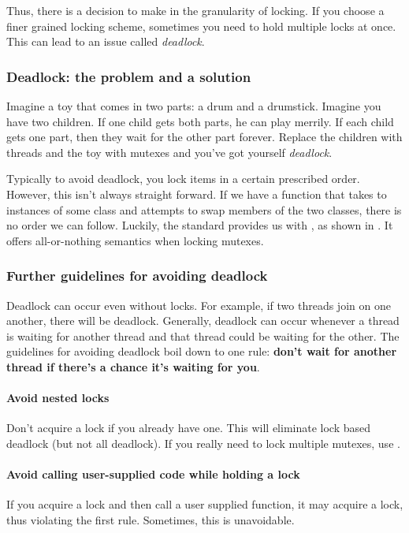 Thus, there is a decision to make in the granularity of locking. If you choose a finer grained locking scheme, sometimes you need to hold multiple locks at once. This can lead to an issue called \emph{deadlock}.

\subsubsection{Deadlock: the problem and a solution}
Imagine a toy that comes in two parts: a drum and a drumstick. Imagine you have two children. If one child gets both parts, he can play merrily. If each child gets one part, then they wait for the other part forever. Replace the children with threads and the toy with mutexes and you've got yourself \emph{deadlock}.

Typically to avoid deadlock, you lock items in a certain prescribed order. However, this isn't always straight forward. If we have a function that takes to instances of some class and attempts to swap members of the two classes, there is no order we can follow. Luckily, the standard provides us with , as shown in . It offers all-or-nothing semantics when locking mutexes. 


\subsubsection{Further guidelines for avoiding deadlock}
Deadlock can occur even without locks. For example, if two threads join on one another, there will be deadlock. Generally, deadlock can occur whenever a thread is waiting for another thread and that thread could be waiting for the other. The guidelines for avoiding deadlock boil down to one rule: \textbf{don't wait for another thread if there's a chance it's waiting for you}.

\paragraph{Avoid nested locks}
Don't acquire a lock if you already have one. This will eliminate lock based deadlock (but not all deadlock). If you really need to lock multiple mutexes, use .

\paragraph{Avoid calling user-supplied code while holding a lock}
If you acquire a lock and then call a user supplied function, it may acquire a lock, thus violating the first rule. Sometimes, this is unavoidable.

